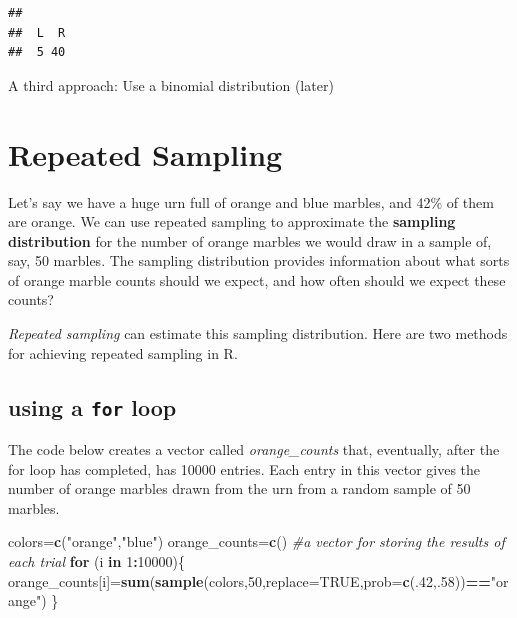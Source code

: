 \documentclass[
]{book}
\newenvironment{Shaded}{\begin{snugshade}}{\end{snugshade}}
\newcommand{\AttributeTok}[1]{\textcolor[rgb]{0.13,0.29,0.53}{#1}}
\newcommand{\CommentTok}[1]{\textcolor[rgb]{0.56,0.35,0.01}{\textit{#1}}}
\newcommand{\ConstantTok}[1]{\textcolor[rgb]{0.56,0.35,0.01}{#1}}
\newcommand{\ControlFlowTok}[1]{\textcolor[rgb]{0.13,0.29,0.53}{\textbf{#1}}}
\newcommand{\DecValTok}[1]{\textcolor[rgb]{0.00,0.00,0.81}{#1}}
\newcommand{\FunctionTok}[1]{\textcolor[rgb]{0.13,0.29,0.53}{\textbf{#1}}}
\newcommand{\NormalTok}[1]{#1}
\newcommand{\OtherTok}[1]{\textcolor[rgb]{0.56,0.35,0.01}{#1}}
\newcommand{\SpecialCharTok}[1]{\textcolor[rgb]{0.81,0.36,0.00}{\textbf{#1}}}
\newcommand{\StringTok}[1]{\textcolor[rgb]{0.31,0.60,0.02}{#1}}
\theoremstyle{definition}
\theoremstyle{definition}
\theoremstyle{definition}
\theoremstyle{definition}
\theoremstyle{remark}
\begin{document}
\begin{verbatim}
## 
##  L  R 
##  5 40
\end{verbatim}

A third approach: Use a binomial distribution (later)

\section{Repeated Sampling}\label{repeated-sampling}

Let's say we have a huge urn full of orange and blue marbles, and 42\% of them are orange. We can use repeated sampling to approximate the \textbf{sampling distribution} for the number of orange marbles we would draw in a sample of, say, 50 marbles.
The sampling distribution provides information about what sorts of orange marble counts should we expect, and how often should we expect these counts?

\emph{Repeated sampling} can estimate this sampling distribution. Here are two methods for achieving repeated sampling in R.

\subsection*{\texorpdfstring{using a \texttt{for} loop}{using a for loop}}\label{using-a-for-loop}

The code below creates a vector called \emph{orange\_counts} that, eventually, after the for loop has completed, has 10000 entries. Each entry in this vector gives the number of orange marbles drawn from the urn from a random sample of 50 marbles.

\begin{Shaded}
\begin{Highlighting}[]
\NormalTok{colors}\OtherTok{=}\FunctionTok{c}\NormalTok{(}\StringTok{"orange"}\NormalTok{,}\StringTok{"blue"}\NormalTok{)}
\NormalTok{orange\_counts}\OtherTok{=}\FunctionTok{c}\NormalTok{() }\CommentTok{\#a vector for storing the results of each trial}
\ControlFlowTok{for}\NormalTok{ (i }\ControlFlowTok{in} \DecValTok{1}\SpecialCharTok{:}\DecValTok{10000}\NormalTok{)\{}
\NormalTok{  orange\_counts[i]}\OtherTok{=}\FunctionTok{sum}\NormalTok{(}\FunctionTok{sample}\NormalTok{(colors,}\DecValTok{50}\NormalTok{,}\AttributeTok{replace=}\ConstantTok{TRUE}\NormalTok{,}\AttributeTok{prob=}\FunctionTok{c}\NormalTok{(.}\DecValTok{42}\NormalTok{,.}\DecValTok{58}\NormalTok{))}\SpecialCharTok{==}\StringTok{"orange"}\NormalTok{)}
\NormalTok{\}}
\end{Highlighting}
\end{Shaded}
\end{document}
